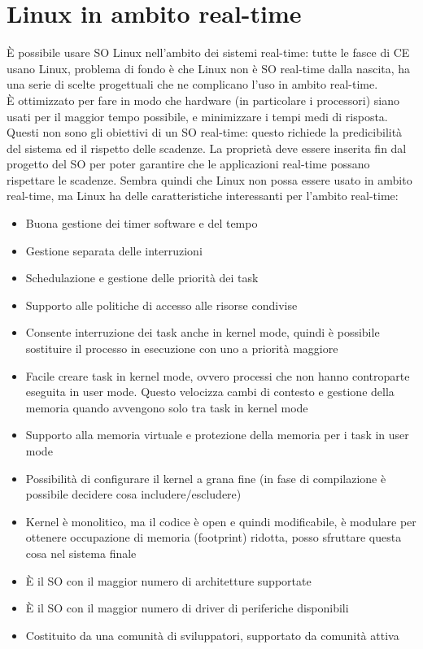\documentclass{article}
\begin{document}
\section{Linux in ambito real-time}
È possibile usare SO Linux nell'ambito dei sistemi real-time: tutte le fasce di CE usano Linux, problema di fondo è che Linux non è SO real-time dalla nascita, ha una serie di scelte progettuali che ne complicano l'uso in ambito real-time.\\ È ottimizzato per fare in modo che hardware (in particolare i processori) siano usati per il maggior tempo possibile, e minimizzare i tempi medi di risposta.\\ Questi non sono gli obiettivi di un SO real-time: questo richiede la predicibilità del sistema ed il rispetto delle scadenze. La proprietà deve essere inserita fin dal progetto del SO per poter garantire che le applicazioni real-time possano rispettare le scadenze. Sembra quindi che Linux non possa essere usato in ambito real-time, ma Linux ha delle caratteristiche interessanti per l'ambito real-time:
\begin{itemize}
\item Buona gestione dei timer software e del tempo
\item Gestione separata delle interruzioni
\item Schedulazione e gestione delle priorità dei task
\item Supporto alle politiche di accesso alle risorse condivise
\item Consente interruzione dei task anche in kernel mode, quindi è possibile sostituire il processo in esecuzione con uno a priorità maggiore
\item Facile creare task in kernel mode, ovvero processi che non hanno controparte eseguita in user mode. Questo velocizza cambi di contesto e gestione della memoria quando avvengono solo tra task in kernel mode
\item Supporto alla memoria virtuale e protezione della memoria per i task in user mode
\item Possibilità di configurare il kernel a grana fine (in fase di compilazione è possibile decidere cosa includere/escludere)
\item Kernel è monolitico, ma il codice è open e quindi modificabile, è modulare per ottenere occupazione di memoria (footprint) ridotta, posso sfruttare questa cosa nel sistema finale
\item È il SO con il maggior numero di architetture supportate
\item È il SO con il maggior numero di driver di periferiche disponibili
\item Costituito da una comunità di sviluppatori, supportato da comunità attiva
\end{itemize}
\end{document}
